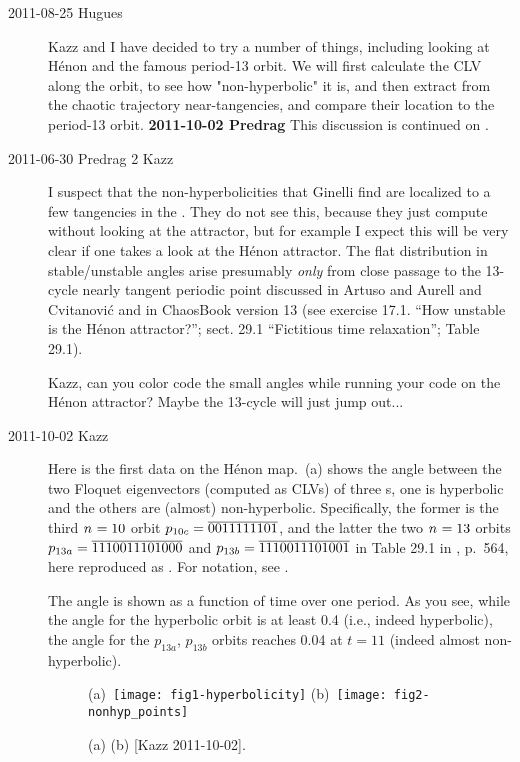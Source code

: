 \begin{description}
\item[2011-08-25 Hugues]
Kazz and I have decided to try a number of things, including looking at
H\'enon and the famous period-13 orbit. We will first calculate the CLV
along the orbit, to see how "non-hyperbolic" it is, and then extract from
the chaotic trajectory near-tangencies, and compare their location to the
period-13 orbit. {\bf 2011-10-02 Predrag} This discussion is continued on
.

\item[2011-06-30 Predrag 2 Kazz]
I suspect that the  non-hyperbolicities that
Ginelli\etal{} find are localized to a few tangencies in
the \statesp. They do not see this, because they just compute without
looking at the attractor, but for example I expect this will be very
clear if one takes a look at the H\'enon attractor. The flat distribution
in stable/unstable angles arise presumably {\em only} from close passage
to the 13-cycle nearly tangent periodic point discussed in Artuso and
Aurell and Cvitanovi{\'{c}} and in ChaosBook version 13 (see
exercise 17.1. ``How unstable is the H\'enon attractor?''; sect. 29.1
``Fictitious time relaxation''; Table 29.1).

Kazz, can you color code the small angles while running your code on the
H\'enon attractor? Maybe the 13-cycle will just jump out...

\item[2011-10-02 Kazz]
Here is the first data on the H\'enon map.
\,(a) shows the angle between the two
Floquet eigenvectors (computed as CLVs) of three \po s, one is hyperbolic
and the others are (almost) non-hyperbolic. Specifically, the former is
the third ${n_{}}=10$ orbit $p_{10c} = \overline{0011111101}$, and the latter
the two ${n_{}}=13$ orbits $p_{13a} = \overline{1110011101000}$ and $p_{13b}
= \overline{1110011101001}$ in Table 29.1 in
,
p.~564, here reproduced as . For notation, see
.

The angle is shown as a function of time over one period. As you
see, while the angle for the hyperbolic orbit is at least 0.4 (i.e.,
indeed hyperbolic), the angle for the $p_{13a}$, $p_{13b}$ orbits reaches 0.04
at $t=11$ (indeed almost non-hyperbolic).

\begin{figure}
 (a)~\texttt{[image: fig1-hyperbolicity]}
 (b)~\texttt{[image: fig2-nonhyp\_points]}
\caption{
(a)
(b)
[Kazz 2011-10-02].
}
\label{fig:HenonNonHypPoints}
\end{figure}


\end{description}
